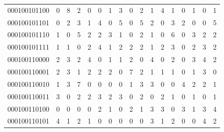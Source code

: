 \documentclass[10pt,a4paper]{article}
\begin{document}
\begin{longtable}{ |c|c|c|c|c|c|c|c|c|c|c|c|c|c|c|c|c| }
    000100101100              & 0                            & 8                                & 2                            & 0                              & 0   & 1   & 3   & 0   & 2   & 1   & 4   & 1   & 0   & 1   & 0   & 1   \\
    000100101101              & 0                            & 2                                & 3                            & 1                              & 4   & 0   & 5   & 0   & 5   & 2   & 0   & 3   & 2   & 0   & 0   & 5   \\
    000100101110              & 1                            & 0                                & 5                            & 2                              & 2   & 3   & 1   & 0   & 2   & 1   & 0   & 6   & 0   & 3   & 2   & 2   \\
    000100101111              & 1                            & 1                                & 0                            & 2                              & 4   & 1   & 2   & 2   & 2   & 1   & 2   & 3   & 0   & 2   & 3   & 2   \\
    000100110000              & 2                            & 3                                & 2                            & 4                              & 0   & 1   & 1   & 2   & 0   & 4   & 0   & 2   & 0   & 3   & 4   & 2   \\
    000100110001              & 2                            & 3                                & 1                            & 2                              & 2   & 2   & 0   & 7   & 2   & 1   & 1   & 1   & 0   & 1   & 3   & 0   \\
    000100110010              & 1                            & 3                                & 7                            & 0                              & 0   & 0   & 0   & 1   & 3   & 3   & 0   & 0   & 4   & 2   & 2   & 1   \\
    000100110011              & 3                            & 0                                & 2                            & 2                              & 3   & 2   & 3   & 0   & 2   & 0   & 2   & 1   & 0   & 1   & 0   & 1   \\
    000100110100              & 0                            & 0                                & 0                            & 0                              & 2   & 1   & 0   & 2   & 1   & 3   & 3   & 0   & 3   & 1   & 3   & 4   \\
    000100110101              & 4                            & 1                                & 2                            & 1                              & 0   & 0   & 0   & 0   & 0   & 3   & 1   & 2   & 0   & 0   & 4   & 2   \\

\end{longtable}
\end{document}
